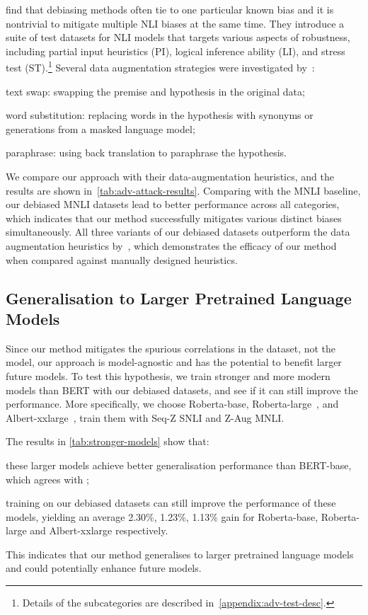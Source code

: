 \citet{model-agnostic-debias} find that debiasing methods often tie to one particular known bias and it is nontrivial to mitigate multiple NLI biases at the same time.
They introduce a suite of test datasets for NLI models that targets various aspects of robustness, including partial input heuristics (PI), logical inference ability (LI), and stress test (ST).\footnote{Details of the subcategories are described in~\cref{appendix:adv-test-desc}.}
Several data augmentation strategies were investigated by~\citet{model-agnostic-debias}:
\begin{inparaenum}[1)]
\item text swap: swapping the premise and hypothesis in the original data;
\item word substitution: replacing words in the hypothesis with synonyms or generations from a masked language model;
\item paraphrase: using back translation to paraphrase the hypothesis.
\end{inparaenum}

We compare our approach with their data-augmentation heuristics, and the results are shown in~\cref{tab:adv-attack-results}.
Comparing with the MNLI baseline, our debiased MNLI datasets lead to better performance across all categories, which indicates that our method successfully mitigates various distinct biases simultaneously.
All three variants of our debiased datasets outperform the data augmentation heuristics by~\citet{liu2021toward},
which demonstrates the efficacy of our method when compared against manually designed heuristics.

\subsection{Generalisation to Larger Pretrained Language Models} \label{sec:larger-models}

Since our method mitigates the spurious correlations in the dataset, not the model, our approach is model-agnostic and has the potential to benefit larger future models.
To test this hypothesis, we train stronger and more modern models than BERT with our debiased datasets, and see if it can still improve the performance.
More specifically, we choose Roberta-base, Roberta-large~\citep{roberta}, and Albert-xxlarge~\citep{albert}, train them with Seq-Z SNLI and Z-Aug MNLI.

The results in \cref{tab:stronger-models} show that: 
\begin{inparaenum}[1)]
\item these larger models achieve better generalisation performance than BERT-base, which agrees with \citet{generalise-nli,combat-hype-caution};
\item training on our debiased datasets can still improve the performance of these models, yielding an average 2.30\%, 1.23\%, 1.13\% gain for Roberta-base, Roberta-large and Albert-xxlarge respectively.
\end{inparaenum}
This indicates that our method generalises to larger pretrained language models and could potentially enhance future models.


